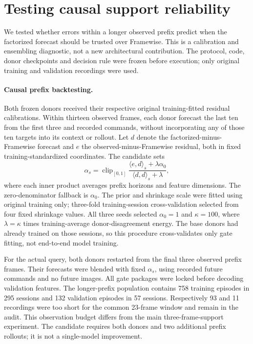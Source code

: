 \section{Testing causal support reliability}
\label{app:reliability-development}
We tested whether errors within a longer observed prefix predict when the
factorized forecast should be trusted over Framewise. This is a calibration and
ensembling diagnostic, not a new architectural contribution. The protocol,
code, donor checkpoints and decision rule were frozen before execution;
only original training and validation recordings were used.

\paragraph{Causal prefix backtesting.}
Both frozen donors received their respective original training-fitted residual
calibrations. Within thirteen observed frames, each donor forecast the last ten
from the first three and recorded commands, without incorporating any of those
ten targets into its context or rollout. Let $d$ denote the factorized-minus-
Framewise forecast and $e$ the observed-minus-Framewise residual, both in fixed
training-standardized coordinates. The candidate sets
\begin{equation}
\alpha_s=\operatorname{clip}_{[0,1]}
\frac{\langle e,d\rangle_s+\lambda\alpha_0}
{\langle d,d\rangle_s+\lambda},
\end{equation}
where each inner product averages prefix horizons and feature dimensions.
The zero-denominator fallback is $\alpha_0$.
The prior and shrinkage scale were fitted using original training only;
three-fold training-session cross-validation selected from four fixed
shrinkage values. All three seeds selected $\alpha_0=1$ and $\kappa=100$,
where $\lambda=\kappa$ times training-average donor-disagreement energy.
The base donors had already trained on those sessions, so this procedure
cross-validates only gate fitting, not end-to-end model training.

For the actual query, both donors restarted from the final three observed
prefix frames. Their forecasts were blended with fixed $\alpha_s$, using
recorded future commands and no future images. All gate packages were locked
before decoding validation features. The longer-prefix population contains
758 training episodes in 295 sessions and 132 validation episodes in
57 sessions. Respectively 93 and 11 recordings were too short for the common
23-frame window and remain in the audit. This observation budget differs from
the main three-frame-support experiment. The candidate requires both donors
and two additional prefix rollouts; it is not a single-model improvement.

